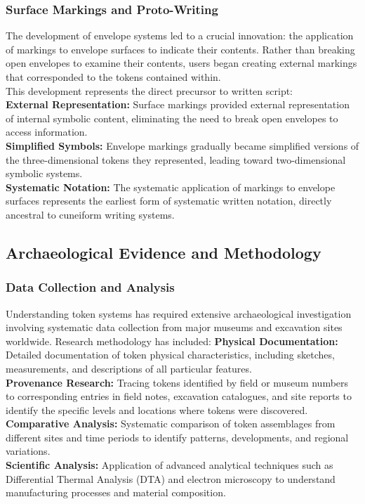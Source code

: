 \documentclass[12pt, oneside, openany]{book}
\begin{document}
\subsubsection{Surface Markings and Proto-Writing}

The development of envelope systems led to a crucial innovation: the application of markings to envelope surfaces to indicate their contents. Rather than breaking open envelopes to examine their contents, users began creating external markings that corresponded to the tokens contained within.\\
This development represents the direct precursor to written script:\\
\textbf{External Representation:} Surface markings provided external representation of internal symbolic content, eliminating the need to break open envelopes to access information.\\
\textbf{Simplified Symbols:} Envelope markings gradually became simplified versions of the three-dimensional tokens they represented, leading toward two-dimensional symbolic systems.\\
\textbf{Systematic Notation:} The systematic application of markings to envelope surfaces represents the earliest form of systematic written notation, directly ancestral to cuneiform writing systems.\\
\subsection{Archaeological Evidence and Methodology}

\subsubsection{Data Collection and Analysis}

Understanding token systems has required extensive archaeological investigation involving systematic data collection from major museums and excavation sites worldwide. Research methodology has included:
\textbf{Physical Documentation:} Detailed documentation of token physical characteristics, including sketches, measurements, and descriptions of all particular features.\\
\textbf{Provenance Research:} Tracing tokens identified by field or museum numbers to corresponding entries in field notes, excavation catalogues, and site reports to identify the specific levels and locations where tokens were discovered.\\
\textbf{Comparative Analysis:} Systematic comparison of token assemblages from different sites and time periods to identify patterns, developments, and regional variations.\\
\textbf{Scientific Analysis:} Application of advanced analytical techniques such as Differential Thermal Analysis (DTA) and electron microscopy to understand manufacturing processes and material composition.
\end{document}
